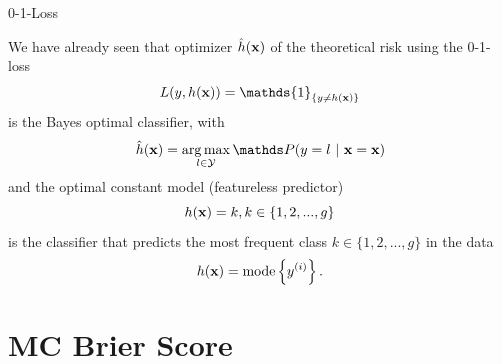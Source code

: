\documentclass[11pt,compress,t,notes=noshow, xcolor=table]{beamer}
\begin{document}
\begin{vbframe}{0-1-Loss}

We have already seen that optimizer $\hat{h}(\mathbf{x})$ of the theoretical risk using the 0-1-loss 
$$ 
L(y, \hx) = \mathds{1}_{\{y \neq \hx\}} 
$$
is the Bayes optimal classifier, with
$$ 
\hxh = \argmax_{l \in \Yspace} \P(y = l~|~ \xv = \xv)
$$
and the optimal constant model (featureless predictor) 
$$
h(\mathbf{x}) = k, k \in \{1, 2, ..., g\} 
$$
is the classifier that predicts the most frequent class $k \in \{1, 2, ..., g\}$ in the data
$$
h(\mathbf{x}) = \text{mode} \left\{y^{(i)}\right\}.
$$
\framebreak



\end{vbframe}



\section{MC Brier Score}
\end{document}
